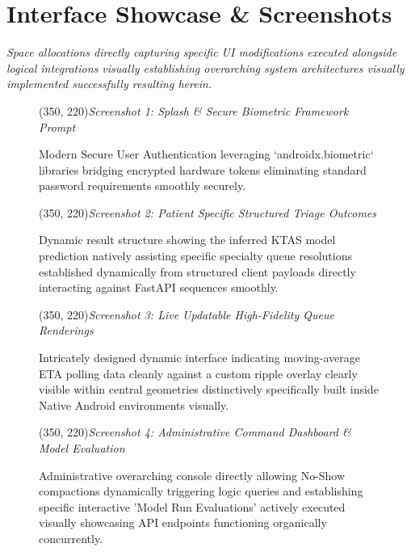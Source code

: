 \documentclass[12pt,a4paper]{article}
\begin{document}
\section{Interface Showcase \& Screenshots}

\textit{Space allocations directly capturing specific UI modifications executed alongside logical integrations visually establishing overarching system architectures visually implemented successfully resulting herein.}

\vspace{0.5cm}
\begin{figure}[H]
    \centering
    \framebox(350, 220){\textit{Screenshot 1: Splash \& Secure Biometric Framework Prompt}}
    \caption{Modern Secure User Authentication leveraging `androidx.biometric` libraries bridging encrypted hardware tokens eliminating standard password requirements smoothly securely.}
    \label{fig:ss_login}
\end{figure}

\vspace{0.5cm}
\begin{figure}[H]
    \centering
    \framebox(350, 220){\textit{Screenshot 2: Patient Specific Structured Triage Outcomes}}
    \caption{Dynamic result structure showing the inferred KTAS model prediction natively assisting specific specialty queue resolutions established dynamically from structured client payloads directly interacting against FastAPI sequences smoothly.}
    \label{fig:ss_triage}
\end{figure}

\vspace{0.5cm}
\begin{figure}[H]
    \centering
    \framebox(350, 220){\textit{Screenshot 3: Live Updatable High-Fidelity Queue Renderings}}
    \caption{Intricately designed dynamic interface indicating moving-average ETA polling data cleanly against a custom ripple overlay clearly visible within central geometries distinctively specifically built inside Native Android environments visually.}
    \label{fig:ss_queue}
\end{figure}

\vspace{0.5cm}
\begin{figure}[H]
    \centering
    \framebox(350, 220){\textit{Screenshot 4: Administrative Command Dashboard \& Model Evaluation}}
    \caption{Administrative overarching console directly allowing No-Show compactions dynamically triggering logic queries and establishing specific interactive 'Model Run Evaluations' actively executed visually showcasing API endpoints functioning organically concurrently.}
    \label{fig:ss_admin_eval}
\end{figure}
\end{document}

